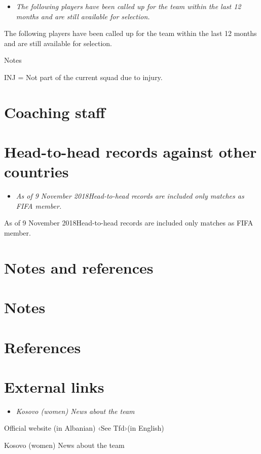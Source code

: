 \begin{itemize}
\item
  \emph{The following players have been called up for the team within
  the last 12 months and are still available for selection.}
\end{itemize}

The following players have been called up for the team within the last
12 months and are still available for selection.

Notes

INJ = Not part of the current squad due to injury.

\section{Coaching staff}\label{coaching-staff}

\section{Head-to-head records against other
countries}\label{head-to-head-records-against-other-countries}

\begin{itemize}
\item
  \emph{As of 9 November 2018Head-to-head records are included only
  matches as FIFA member.}
\end{itemize}

As of 9 November 2018Head-to-head records are included only matches as
FIFA member.

\section{Notes and references}\label{notes-and-references}

\section{Notes}\label{notes}

\section{References}\label{references}

\section{External links}\label{external-links}

\begin{itemize}
\item
  \emph{Kosovo (women) News about the team}
\end{itemize}

Official website (in Albanian) ‹See Tfd›(in English)

Kosovo (women) News about the team
